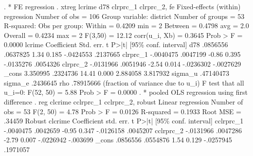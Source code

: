 . * FE regression
. xtreg lcrime d78 clrprc_1 clrprc_2, fe
{\smallskip}
Fixed-effects (within) regression               Number of obs     =        106
Group variable: district                        Number of groups  =         53
{\smallskip}
R-squared:                                      Obs per group:
     Within  = 0.4209                                         min =          2
     Between = 0.4798                                         avg =        2.0
     Overall = 0.4234                                         max =          2
{\smallskip}
                                                F(3,50)           =      12.12
corr(u_i, Xb) = 0.3645                          Prob > F          =     0.0000
{\smallskip}
      lcrime {\VBAR} Coefficient  Std. err.      t    P>|t|     [95\% conf. interval]
         d78 {\VBAR}   .0856556   .0637825     1.34   0.185    -.0424553    .2137665
    clrprc_1 {\VBAR}  -.0040475   .0047199    -0.86   0.395    -.0135276    .0054326
    clrprc_2 {\VBAR}  -.0131966   .0051946    -2.54   0.014    -.0236302   -.0027629
       _cons {\VBAR}   3.350995   .2324736    14.41   0.000     2.884058    3.817932
     sigma_u {\VBAR}  .47140473
     sigma_e {\VBAR}   .2436645
         rho {\VBAR}  .78915666   (fraction of variance due to u_i)
F test that all u_i=0: F(52, 50) = 5.88                      Prob > F = 0.0000
{\smallskip}
. * pooled OLS regression using first difference
. reg clcrime cclrprc_1 cclrprc_2, robust
{\smallskip}
Linear regression                               Number of obs     =         53
                                                F(2, 50)          =       4.78
                                                Prob > F          =     0.0126
                                                R-squared         =     0.1933
                                                Root MSE          =     .34459
{\smallskip}
             {\VBAR}               Robust
     clcrime {\VBAR} Coefficient  std. err.      t    P>|t|     [95\% conf. interval]
   cclrprc_1 {\VBAR}  -.0040475   .0042659    -0.95   0.347    -.0126158    .0045207
   cclrprc_2 {\VBAR}  -.0131966   .0047286    -2.79   0.007    -.0226942    -.003699
       _cons {\VBAR}   .0856556   .0554876     1.54   0.129    -.0257945    .1971057
{\smallskip}
